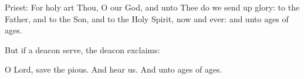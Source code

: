 \begin{liturgicaltext}
    \priest Priest: For holy art Thou, O our God, and unto Thee do we send up glory: to the Father, and to the Son, and to the Holy Spirit, now and ever:  and unto ages of ages.
\end{liturgicaltext}

\begin{rubricsection}

\begin{rubricmed}
    But if a deacon serve, the deacon exclaims:
\end{rubricmed}

\begin{liturgicaltext}
    \deacon O Lord, save the pious.
    \choir {}
    \deacon And hear us.
    \choir {}
    \deacon And unto ages of ages.
\end{liturgicaltext}

\end{rubricsection}